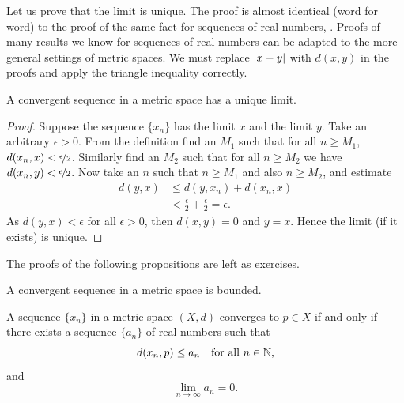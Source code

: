 Let us prove that the limit is unique.  The proof is almost
identical (word for word) to the proof of the same fact for sequences of
real numbers,
.
Proofs of many results we know for sequences of real numbers can be
adapted to
the more general settings of metric spaces.  We must replace $\left\lvert {x-y} \right\rvert$
with $d(x,y)$ in the proofs and apply the triangle inequality correctly.

\begin{prop} \label{prop:mslimisunique}
A convergent sequence in a metric space has a unique limit.
\end{prop}

\begin{proof}
Suppose the sequence $\{ x_n \}$ has the limit $x$ and the limit $y$.
Take an arbitrary $\epsilon > 0$.
From the definition find an $M_1$ such that for all $n \geq M_1$,
$d(x_n,x) < \nicefrac{\epsilon}{2}$.  Similarly find an $M_2$
such that for all $n \geq M_2$ we have
$d(x_n,y) < \nicefrac{\epsilon}{2}$.  Now take an $n$ such that
$n \geq M_1$ and also $n \geq M_2$, and estimate
\begin{equation*}
\begin{split}
d(y,x)
& \leq
d(y,x_n) + d(x_n,x) \\
& <
\frac{\epsilon}{2} + \frac{\epsilon}{2} = \epsilon .
\end{split}
\end{equation*}
As $d(y,x) < \epsilon$ for all $\epsilon > 0$, then $d(x,y) = 0$
and $y=x$.  Hence the limit (if it exists) is unique.
\end{proof}

The proofs of the following propositions are left as exercises.

\begin{prop} \label{prop:msconvbound}
A convergent sequence in a metric space is bounded.
\end{prop}

\begin{prop} \label{prop:msconvifa}
A sequence $\{ x_n \}$ in a metric space $(X,d)$ converges to $p \in X$
if and only
if there exists a sequence $\{ a_n \}$ of real numbers such that
\begin{equation*}
d(x_n,p) \leq a_n \quad \text{for all $n \in {\mathbb{N}}$},
\end{equation*}
and
\begin{equation*}
\lim_{n\to\infty} a_n = 0.
\end{equation*}
\end{prop}

